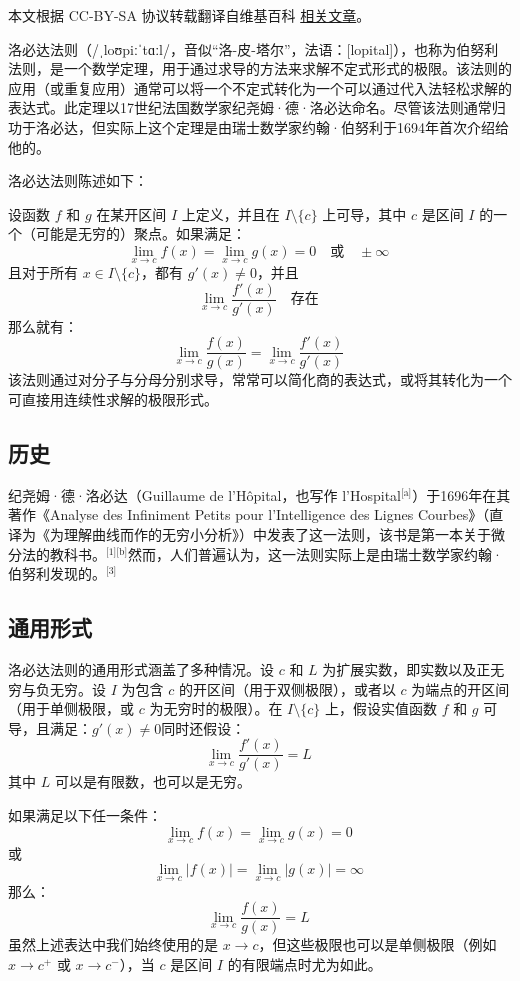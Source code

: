 
本文根据 CC-BY-SA 协议转载翻译自维基百科 \href{https://en.wikipedia.org/wiki/L\%27H\%C3\%B4pital\%27s_rule}{相关文章}。

洛必达法则（/ˌloʊpiːˈtɑːl/，音似“洛-皮-塔尔”，法语：[lopital]），也称为伯努利法则，是一个数学定理，用于通过求导的方法来求解不定式形式的极限。该法则的应用（或重复应用）通常可以将一个不定式转化为一个可以通过代入法轻松求解的表达式。此定理以17世纪法国数学家纪尧姆·德·洛必达命名。尽管该法则通常归功于洛必达，但实际上这个定理是由瑞士数学家约翰·伯努利于1694年首次介绍给他的。

洛必达法则陈述如下：

设函数 $f$ 和 $g$ 在某开区间 $I$ 上定义，并且在 $I \setminus \{c\}$ 上可导，其中 $c$ 是区间 $I$ 的一个（可能是无穷的）聚点。如果满足：
$$
\lim_{x \to c} f(x) = \lim_{x \to c} g(x) = 0 \quad \text{或} \quad \pm \infty~
$$
且对于所有 $x \in I \setminus \{c\}$，都有 $g'(x) \ne 0$，并且
$$
\lim_{x \to c} \frac{f'(x)}{g'(x)} \quad \text{存在}~
$$
那么就有：
$$
\lim_{x \to c} \frac{f(x)}{g(x)} = \lim_{x \to c} \frac{f'(x)}{g'(x)}~
$$
该法则通过对分子与分母分别求导，常常可以简化商的表达式，或将其转化为一个可直接用连续性求解的极限形式。
\subsection{历史}
纪尧姆·德·洛必达（Guillaume de l'Hôpital，也写作 l'Hospital\(^\text{[a]}\)）于1696年在其著作《Analyse des Infiniment Petits pour l'Intelligence des Lignes Courbes》（直译为《为理解曲线而作的无穷小分析》）中发表了这一法则，该书是第一本关于微分法的教科书。\(^\text{[1][b]}\)然而，人们普遍认为，这一法则实际上是由瑞士数学家约翰·伯努利发现的。\(^\text{[3]}\)
\subsection{通用形式}

洛必达法则的通用形式涵盖了多种情况。设 $c$ 和 $L$ 为扩展实数，即实数以及正无穷与负无穷。设 $I$ 为包含 $c$ 的开区间（用于双侧极限），或者以 $c$ 为端点的开区间（用于单侧极限，或 $c$ 为无穷时的极限）。在 $I \setminus \{c\}$ 上，假设实值函数 $f$ 和 $g$ 可导，且满足：$g'(x) \ne 0$同时还假设：
$$
\lim_{x \to c} \frac{f'(x)}{g'(x)} = L~
$$
其中 $L$ 可以是有限数，也可以是无穷。

如果满足以下任一条件：
$$
\lim_{x \to c} f(x) = \lim_{x \to c} g(x) = 0~
$$
或
$$
\lim_{x \to c} |f(x)| = \lim_{x \to c} |g(x)| = \infty ~
$$
那么：
$$
\lim_{x \to c} \frac{f(x)}{g(x)} = L~
$$
虽然上述表达中我们始终使用的是 $x \to c$，但这些极限也可以是单侧极限（例如 $x \to c^+$ 或 $x \to c^-$），当 $c$ 是区间 $I$ 的有限端点时尤为如此。

